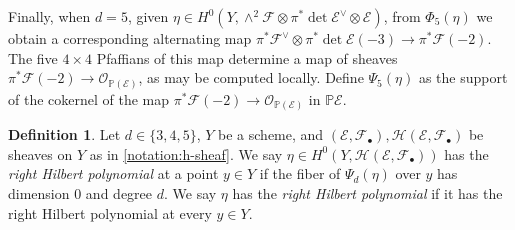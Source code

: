 \documentclass[12 pt]{amsart}
\newcommand{\rboxed}[1]{#1}
\theoremstyle{plain}
\theoremstyle{definition}
\newtheorem{definition}[theorem]{Definition}
\theoremstyle{remark}
\numberwithin{equation}{section}
\newcommand\bp{\mathbb P}
\newcommand\sce{\mathscr E}
\newcommand\scf{\mathscr F}
\newcommand\sch{\mathscr H}
\newcommand\scn{\mathscr N}
\newcommand\sco{\mathscr O}
\newcommand \ra{\rightarrow}
\begin{document}
Finally, when $d = 5$,
given $\eta \in H^0(Y, \wedge^2\scf \otimes \pi^*\det \sce^{\vee} \otimes
\sce)$,
from $\Phi_5(\eta)$ we obtain a corresponding alternating map
$\pi^* \scf^\vee \otimes \pi^* \det \sce(-3) \to \pi^* \scf(-2)$.
The five $4 \times 4$ Pfaffians of this map determine a map of sheaves
$\pi^* \scf(-2) \to \sco_{\bp (\sce)}$,
as may be computed locally.
Define $\Psi_5(\eta)$ as the support of the cokernel of the map
$\pi^* \scf(-2) \to \sco_{\bp (\sce)}$
in $\bp\sce$.

%

\begin{definition}
	\label{definition:right-codim}
	Let $d \in \{3,4,5\}$, $Y$ be a scheme, and $(\sce, \scf_\bullet), \sch(\sce,
	\scf_\bullet)$ be sheaves on $Y$ as in \autoref{notation:h-sheaf}.
	We say $\eta \in H^0(Y, \sch(\sce, \scf_\bullet))$ has the {\em right
	Hilbert polynomial} at a point $y \in Y$ if the fiber of $\Psi_d(\eta)$ over $y$
	has dimension $0$ and degree $d$. We say $\eta$ has the {\em right
	Hilbert polynomial} if it has the right Hilbert polynomial at every $y \in Y$.
\end{definition}
\end{document}
